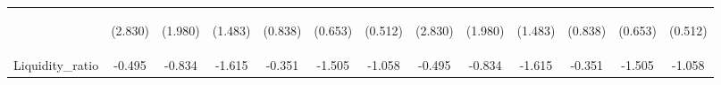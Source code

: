 \documentclass[]{article}
\begin{document}
\begin{center}
\begin{tabular}{lcccccccccccc}
\vspace{4pt} & \begin{footnotesize}(2.830)\end{footnotesize} & \begin{footnotesize}(1.980)\end{footnotesize} & \begin{footnotesize}(1.483)\end{footnotesize} & \begin{footnotesize}(0.838)\end{footnotesize} & \begin{footnotesize}(0.653)\end{footnotesize} & \begin{footnotesize}(0.512)\end{footnotesize} & \begin{footnotesize}(2.830)\end{footnotesize} & \begin{footnotesize}(1.980)\end{footnotesize} & \begin{footnotesize}(1.483)\end{footnotesize} & \begin{footnotesize}(0.838)\end{footnotesize} & \begin{footnotesize}(0.653)\end{footnotesize} & \begin{footnotesize}(0.512)\end{footnotesize} \\
Liquidity\_ratio & -0.495 & -0.834 & -1.615 & -0.351 & -1.505 & -1.058 & -0.495 & -0.834 & -1.615 & -0.351 & -1.505 & -1.058 \\

\end{tabular}
\end{center}
\end{document}
